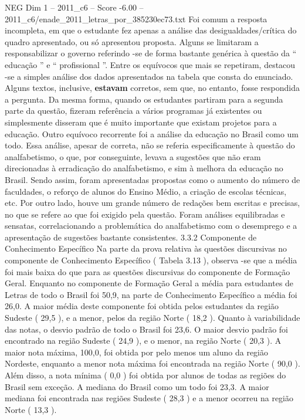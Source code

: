 \begin{textsample}{NEG Dim 1 – 2011\_c6 – Score -6.00 – 2011\_c6/enade\_2011\_letras\_por\_385230ec73.txt}
Foi comum a resposta incompleta, em que o estudante fez apenas a análise das desigualdades/crítica do quadro apresentado, ou só apresentou proposta.
Alguns se limitaram a responsabilizar o governo referindo -se de forma bastante genérica à questão da “ educação ” e “ profissional ”.
Entre os equívocos que mais se repetiram, destacou -se a simples análise dos dados apresentados na tabela que consta do enunciado.
Alguns textos, inclusive, \textbf{estavam} corretos, sem que, no entanto, fosse respondida a pergunta.
Da mesma forma, quando os estudantes partiram para a segunda parte da questão, fizeram referência a vários programas já existentes ou simplesmente disseram que é muito importante que existam projetos para a educação.
Outro equívoco recorrente foi a análise da educação no Brasil como um todo.
Essa análise, apesar de correta, não se referia especificamente à questão do analfabetismo, o que, por conseguinte, levava a sugestões que não eram direcionadas à erradicação do analfabetismo, e sim à melhora da educação no Brasil.
Sendo assim, foram apresentadas propostas como o aumento do número de faculdades, o reforço de alunos do Ensino Médio, a criação de escolas técnicas, etc.
Por outro lado, houve um grande número de redações bem escritas e precisas, no que se refere ao que foi exigido pela questão.
Foram análises equilibradas e sensatas, correlacionando a problemática do analfabetismo com o desemprego e a apresentação de sugestões bastante consistentes. 3.3.2 Componente de Conhecimento Específico Na parte da prova relativa às questões discursivas no componente de Conhecimento Específico ( Tabela 3.13 ), observa -se que a média foi mais baixa do que para as questões discursivas do componente de Formação Geral.
Enquanto no componente de Formação Geral a média para estudantes de Letras de todo o Brasil foi 50,9, na parte de Conhecimento Específico a média foi 26,0.
A maior média deste componente foi obtida pelos estudantes da região Sudeste ( 29,5 ), e a menor, pelos da região Norte ( 18,2 ).
Quanto à variabilidade das notas, o desvio padrão de todo o Brasil foi 23,6.
O maior desvio padrão foi encontrado na região Sudeste ( 24,9 ), e o menor, na região Norte ( 20,3 ).
A maior nota máxima, 100,0, foi obtida por pelo menos um aluno da região Nordeste, enquanto a menor nota máxima foi encontrada na região Norte ( 90,0 ).
Além disso, a nota mínima ( 0,0 ) foi obtida por alunos de todas as regiões do Brasil sem exceção.
A mediana do Brasil como um todo foi 23,3.
A maior mediana foi encontrada nas regiões Sudeste ( 28,3 ) e a menor ocorreu na região Norte ( 13,3 ).

\end{textsample}
